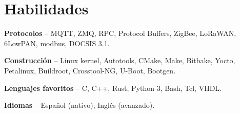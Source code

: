 \section{Habilidades}
\begin{small}
	\parbox[t][][t]{\linewidth}{
		\textbf{Protocolos} -- {MQTT, ZMQ, RPC, 
		Protocol Buffers, ZigBee, LoRaWAN, 6LowPAN, modbus, DOCSIS 3.1.}
		\bigbreak
	}
	\parbox[t][][t]{\linewidth}{
		\textbf{Construcción} -- {Linux kernel, 
		Autotools, CMake, Make, Bitbake, Yocto, Petalinux, Buildroot, Crosstool-NG, U-Boot, 
		Bootgen.}
		\bigbreak
	}
	\parbox[t][][t]{\linewidth}{
		\textbf{Lenguajes favoritos} -- {C, C++, Rust, Python 3, Bash, Tcl, VHDL.}
		\bigbreak
	}
	\parbox[t][][t]{\linewidth}{
		\textbf{Idiomas} -- {Español (nativo), Inglés (avanzado).}
		\bigbreak
	}
\end{small}
